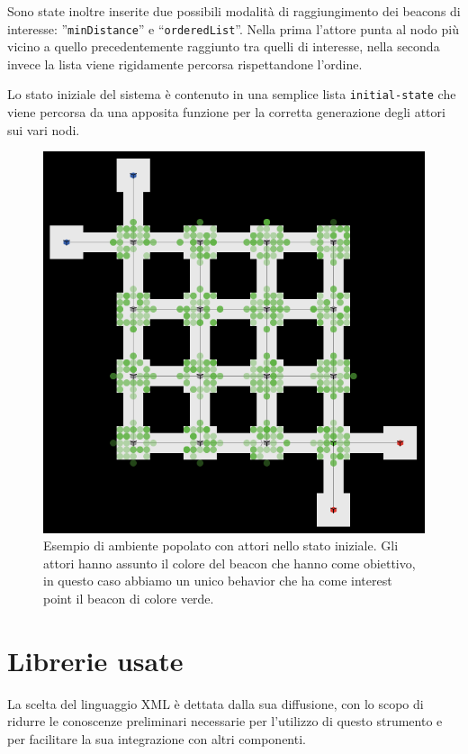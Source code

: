 Sono state inoltre inserite due possibili modalità di raggiungimento dei beacons di interesse: ”\texttt{minDistance}” e “\texttt{orderedList}”. Nella prima l'attore punta al nodo più vicino a quello precedentemente raggiunto tra quelli di interesse, nella seconda invece la lista viene rigidamente percorsa rispettandone l'ordine.

Lo stato iniziale del sistema è contenuto in una semplice lista \texttt{initial-state} che viene percorsa da una apposita funzione per la corretta generazione degli attori sui vari nodi. 
\begin{figure}[htbp]
\centering
\includegraphics[width=\textwidth,height=\textheight,keepaspectratio]{images/movers-screen.png}
\caption{Esempio di ambiente popolato con attori nello stato iniziale. Gli attori hanno assunto il colore del beacon che hanno come obiettivo, in questo caso abbiamo un unico behavior che ha come interest point il beacon di colore verde.}
\label{fig:movers-screen}
\end{figure}

\section{Librerie usate}
\label{sec:librerie}
La scelta del linguaggio XML è dettata dalla sua diffusione, con lo scopo di ridurre le conoscenze preliminari necessarie per l'utilizzo di questo strumento e per facilitare la sua integrazione con altri componenti.

